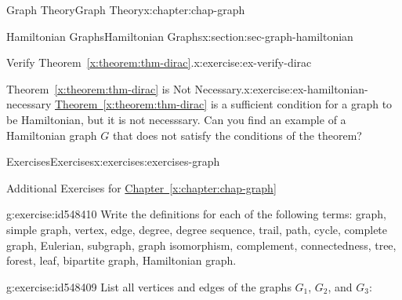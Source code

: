 \documentclass[oneside,10pt,]{book}
\newcommand{\xreffont}{\relax}
\numberwithin{equation}{section}
\begin{document}
\begin{chapterptx}{Graph Theory}{}{Graph Theory}{}{}{x:chapter:chap-graph}
\begin{sectionptx}{Hamiltonian Graphs}{}{Hamiltonian Graphs}{}{}{x:section:sec-graph-hamiltonian}
\begin{inlineexercise}{Verify Theorem~{\xreffont\ref*{x:theorem:thm-dirac}}.}{x:exercise:ex-verify-dirac}
\begin{sidebyside}{1}{0.325}{0.325}{0}
\begin{sbspanel}{0.35}
{
}%
\end{sbspanel}%
\end{sidebyside}%
\end{inlineexercise}%
\begin{inlineexercise}{Theorem~{\xreffont\ref*{x:theorem:thm-dirac}} is Not Necessary.}{x:exercise:ex-hamiltonian-necessary}%
\hyperref[x:theorem:thm-dirac]{Theorem~{\xreffont\ref{x:theorem:thm-dirac}}} is a sufficient condition for a graph to be Hamiltonian, but it is not necesssary. Can you find an example of a Hamiltonian graph \(G\) that does not satisfy the conditions of the theorem?%
\end{inlineexercise}%
\end{sectionptx}
%
%
\typeout{************************************************}
\typeout{************************************************}
%
\begin{exercises-section}{Exercises}{}{Exercises}{}{}{x:exercises:exercises-graph}
\begin{introduction}{}%
Additional Exercises for \hyperref[x:chapter:chap-graph]{Chapter~{\xreffont\ref{x:chapter:chap-graph}}}%
\end{introduction}%
\begin{divisionexercise}{1}{}{}{g:exercise:id548410}%
Write the definitions for each of the following terms: graph, simple graph, vertex, edge, degree, degree sequence, trail, path, cycle, complete graph, Eulerian, subgraph, graph isomorphism, complement, connectedness, tree, forest, leaf, bipartite graph, Hamiltonian graph.%
\end{divisionexercise}%
\begin{divisionexercise}{2}{}{}{g:exercise:id548409}%
List all vertices and edges of the graphs \(G_1\), \(G_2\), and \(G_3\):%
\begin{sidebyside}{3}{0.0516666666666667}{0.0516666666666667}{0.103333333333333}%

\end{sidebyside}
\end{divisionexercise}
\end{exercises-section}
\end{chapterptx}
\end{document}
